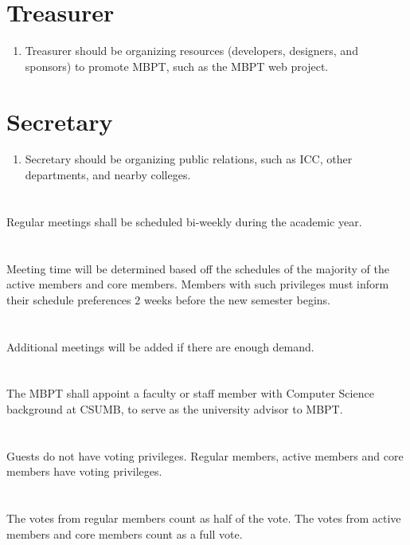 \documentclass[20pt]{constitution}
\begin{document}
\section{Treasurer}
\begin{enumerate}
    \item Treasurer should be organizing resources (developers, designers, and sponsors) 
    to promote MBPT, such as the MBPT web project.
\end{enumerate}

\section{Secretary}
\begin{enumerate}
    \item Secretary should be organizing public relations, such as ICC, other departments, and nearby colleges. 
\end{enumerate}

\section{}
Regular meetings shall be scheduled bi-weekly during the academic year.
\section{}
Meeting time will be determined based off the schedules of the majority of the active members and core members.
Members with such privileges must inform their schedule preferences 2 weeks before the new semester begins.
\section{}
Additional meetings will be added if there are enough demand. 

\section{}
The MBPT shall appoint a faculty or staff member with Computer Science background at CSUMB,
to serve as the university advisor to MBPT. 

\section{}
Guests do not have voting privileges.
Regular members, active members and core members have voting privileges.
\section{}
The votes from regular members count as half of the vote.
The votes from active members and core members count as a full vote. 
\end{document}
